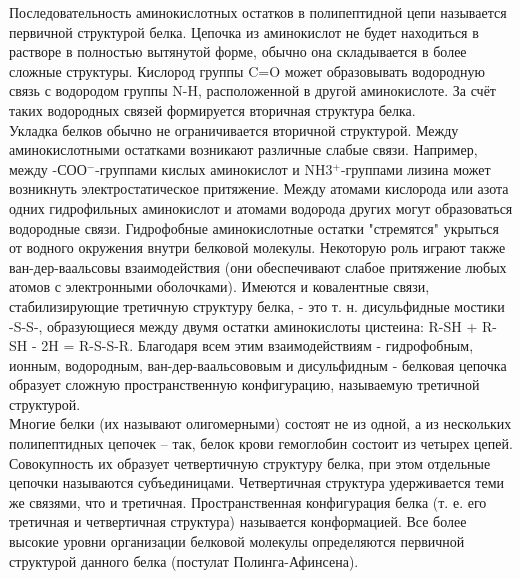 \documentclass[a4paper,14pt]{article}
\begin{document}
Последовательность аминокислотных остатков в полипептидной цепи называется первичной структурой белка.
Цепочка из аминокислот не будет находиться в растворе в полностью вытянутой форме, обычно она складывается в более сложные структуры. Кислород группы C=O может образовывать водородную связь с водородом группы N-H, расположенной в другой аминокислоте. За счёт таких водородных связей формируется вторичная структура белка.\\
Укладка белков обычно не ограничивается вторичной структурой. Между аминокислотными остатками возникают различные слабые связи. Например, между -СОО$^-$-группами кислых аминокислот и NH3$^+$-группами лизина может возникнуть электростатическое притяжение. Между атомами кислорода или азота одних гидрофильных аминокислот и атомами водорода других могут образоваться водородные связи. Гидрофобные аминокислотные остатки "стремятся" укрыться от водного окружения внутри белковой молекулы. Некоторую роль играют также ван-дер-ваальсовы взаимодействия (они обеспечивают слабое притяжение любых атомов с электронными оболочками). Имеются и ковалентные связи, стабилизирующие третичную структуру белка, - это т. н. дисульфидные мостики -S-S-, образующиеся между двумя остатки аминокислоты цистеина: R-SH + R-SH - 2H = R-S-S-R. Благодаря всем этим взаимодействиям - гидрофобным, ионным, водородным, ван-дер-ваальсововым и дисульфидным - белковая цепочка образует сложную пространственную конфигурацию, называемую третичной структурой.\\
Многие белки (их называют олигомерными) состоят не из одной, а из нескольких полипептидных цепочек – так, белок крови гемоглобин состоит из четырех цепей. Совокупность их образует четвертичную структуру белка, при этом отдельные цепочки называются субъединицами. Четвертичная структура удерживается теми же связями, что и третичная. Пространственная конфигурация белка (т. е. его третичная и четвертичная структура) называется конформацией. Все более высокие уровни организации белковой молекулы определяются первичной структурой данного белка (постулат Полинга-Афинсена).


\end{document}
